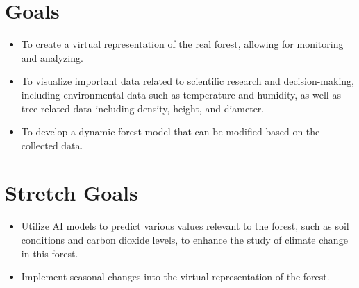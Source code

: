 \documentclass{article}
\begin{document}
\section{Goals}
\begin{itemize}
\item To create a virtual representation of the real forest, allowing for monitoring and analyzing.
\item To visualize important data related to scientific 
research and decision-making, including environmental data such as temperature and humidity, as well as tree-related data including density, height, and diameter.
\item To develop a dynamic forest model that can be modified based on the collected data.
\end{itemize}

\section{Stretch Goals}

\begin{itemize}
\item Utilize AI models to predict various values relevant to the forest, such as soil conditions and carbon dioxide levels, to enhance the study of climate change in this forest.
\item Implement seasonal changes into the virtual representation of the forest.
\end{itemize}
\end{document}
